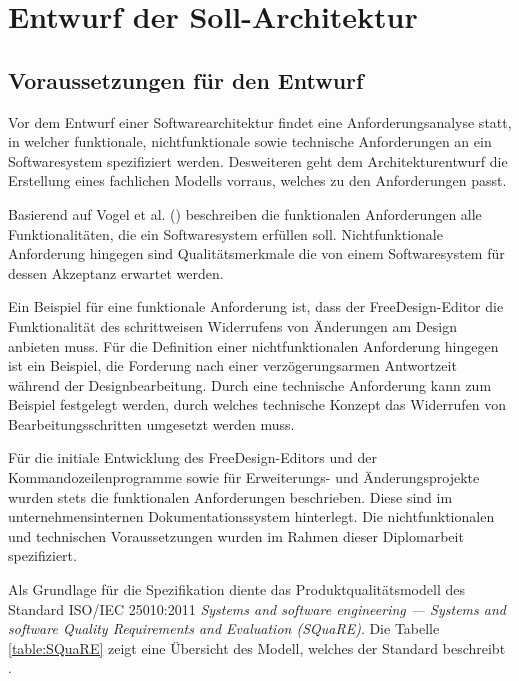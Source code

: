 \section{Entwurf der Soll-Architektur}

\subsection{Voraussetzungen für den Entwurf}
Vor dem Entwurf einer Softwarearchitektur findet eine Anforderungsanalyse statt, in welcher funktionale, nichtfunktionale sowie technische Anforderungen an ein Softwaresystem spezifiziert werden. Desweiteren geht dem Architekturentwurf die Erstellung eines fachlichen Modells vorraus, welches zu den Anforderungen passt. \autocite[vgl.][S. 58 - 59]{Posch2007}

Basierend auf Vogel et al. (\citeyear[vgl.][S. 113 - 114]{Vogel2009}) beschreiben die funktionalen Anforderungen alle Funktionalitäten, die ein Softwaresystem erfüllen soll. Nichtfunktionale Anforderung hingegen sind Qualitätsmerkmale die von einem Softwaresystem für dessen Akzeptanz erwartet werden. 

Ein Beispiel für eine funktionale Anforderung ist, dass der FreeDesign-Editor die Funktionalität des schrittweisen Widerrufens von Änderungen am Design anbieten muss. 
Für die Definition einer nichtfunktionalen Anforderung hingegen ist ein Beispiel, die Forderung nach einer verzögerungsarmen Antwortzeit während der Designbearbeitung.
Durch eine technische Anforderung kann zum Beispiel festgelegt werden, durch welches technische Konzept das Widerrufen von Bearbeitungsschritten umgesetzt werden muss. 

Für die initiale Entwicklung des FreeDesign-Editors und der Kommandozeilenprogramme sowie für Erweiterungs- und Änderungsprojekte wurden stets die funktionalen Anforderungen beschrieben. Diese sind im unternehmensinternen Dokumentationssystem hinterlegt. 
Die nichtfunktionalen und technischen Voraussetzungen wurden im Rahmen dieser Diplomarbeit spezifiziert. 

Als Grundlage für die Spezifikation diente das Produktqualitätsmodell des Standard ISO/IEC 25010:2011 \emph{Systems and software engineering — Systems and software Quality Requirements and Evaluation (SQuaRE)}. 
Die Tabelle \ref{table:SQuaRE} zeigt eine Übersicht des Modell, welches der Standard beschreibt \autocite[vgl.][S. 10]{ISO25010}. 

